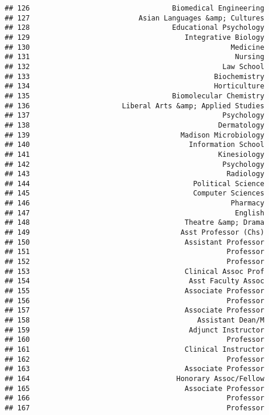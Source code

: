 \documentclass[
]{article}
\begin{document}
\begin{verbatim}
## 126                                  Biomedical Engineering
## 127                          Asian Languages &amp; Cultures
## 128                                  Educational Psychology
## 129                                     Integrative Biology
## 130                                                Medicine
## 131                                                 Nursing
## 132                                              Law School
## 133                                            Biochemistry
## 134                                            Horticulture
## 135                                  Biomolecular Chemistry
## 136                      Liberal Arts &amp; Applied Studies
## 137                                              Psychology
## 138                                             Dermatology
## 139                                    Madison Microbiology
## 140                                      Information School
## 141                                             Kinesiology
## 142                                              Psychology
## 143                                               Radiology
## 144                                       Political Science
## 145                                       Computer Sciences
## 146                                                Pharmacy
## 147                                                 English
## 148                                     Theatre &amp; Drama
## 149                                    Asst Professor (Chs)
## 150                                     Assistant Professor
## 151                                               Professor
## 152                                               Professor
## 153                                     Clinical Assoc Prof
## 154                                      Asst Faculty Assoc
## 155                                     Associate Professor
## 156                                               Professor
## 157                                     Associate Professor
## 158                                        Assistant Dean/M
## 159                                      Adjunct Instructor
## 160                                               Professor
## 161                                     Clinical Instructor
## 162                                               Professor
## 163                                     Associate Professor
## 164                                   Honorary Assoc/Fellow
## 165                                     Associate Professor
## 166                                               Professor
## 167                                               Professor

\end{verbatim}
\end{document}
